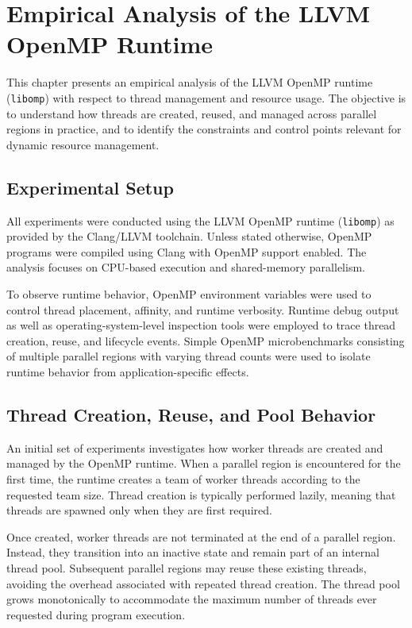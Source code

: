 
\chapter{Empirical Analysis of the LLVM OpenMP Runtime}\label{chapter:llvm_runtime_analysis}

This chapter presents an empirical analysis of the LLVM OpenMP runtime (\texttt{libomp}) with respect to thread management and resource usage. The objective is to understand how threads are created, reused, and managed across parallel regions in practice, and to identify the constraints and control points relevant for dynamic resource management.

\section{Experimental Setup}

All experiments were conducted using the LLVM OpenMP runtime (\texttt{libomp}) as provided by the Clang/LLVM toolchain. Unless stated otherwise, OpenMP programs were compiled using Clang with OpenMP support enabled. The analysis focuses on CPU-based execution and shared-memory parallelism.

To observe runtime behavior, OpenMP environment variables were used to control thread placement, affinity, and runtime verbosity. Runtime debug output as well as operating-system-level inspection tools were employed to trace thread creation, reuse, and lifecycle events. Simple OpenMP microbenchmarks consisting of multiple parallel regions with varying thread counts were used to isolate runtime behavior from application-specific effects.

\section{Thread Creation, Reuse, and Pool Behavior}

An initial set of experiments investigates how worker threads are created and managed by the OpenMP runtime. When a parallel region is encountered for the first time, the runtime creates a team of worker threads according to the requested team size. Thread creation is typically performed lazily, meaning that threads are spawned only when they are first required.

Once created, worker threads are not terminated at the end of a parallel region. Instead, they transition into an inactive state and remain part of an internal thread pool. Subsequent parallel regions may reuse these existing threads, avoiding the overhead associated with repeated thread creation. The thread pool grows monotonically to accommodate the maximum number of threads ever requested during program execution.

